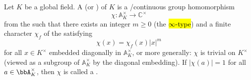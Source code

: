 \begin{definition} \label{definition:hecke_character_of_a_number_field}

Let $K$ be a global field. A  (or ) of $K$ is a /continuous group homomorphism
$$ \chi : \mathbb{A}_K^\times \to \mathbb{C}^\times $$
from the  such that there exists an integer $m \geq 0$ (the \hl{$\infty$-type}) and a finite character $\chi_f$ of the  satisfying
$$ \chi(x) = \chi_f(x) |x|^m $$
for all $x \in K^\times$ embedded diagonally in $\mathbb{A}_K^\times$, or more generally: $\chi$ is trivial on $K^\times$ (viewed as a subgroup of $\mathbb{A}_K^\times$ by the diagonal embedding). If $|\chi(a)| = 1$ for all $a \in \bbA_K^\times$, then $\chi$ is called a .
\end{definition}
